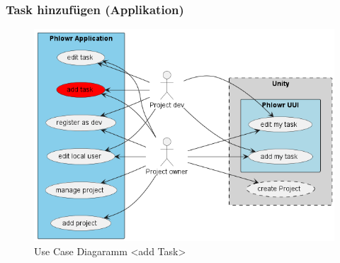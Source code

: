 \subsubsection{Task hinzufügen (Applikation)}

\begin{figure}[H]
    \begin{center}
      \includegraphics[width=0.25\linewidth]{../content/diagrams/usecase/overview/overviewUseCaseAddTaskSelected.png}
      \caption{Use Case Diagaramm <add Task> }
    \end{center}
  \end{figure}

